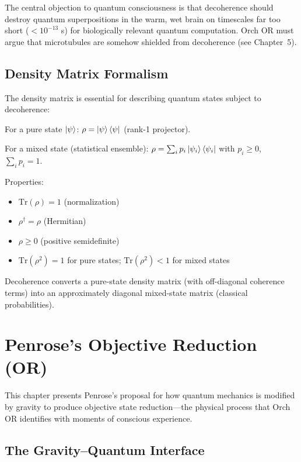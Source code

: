 \documentclass[11pt,a4paper]{report}
\begin{document}
The central objection to quantum consciousness is that decoherence should destroy quantum superpositions in the warm, wet brain on timescales far too short ($< 10^{-13}$ s) for biologically relevant quantum computation. Orch OR must argue that microtubules are somehow shielded from decoherence (see Chapter~5).

\section{Density Matrix Formalism}

The density matrix is essential for describing quantum states subject to decoherence:

\begin{definitionbox}
For a pure state $\ket{\psi}$: $\rho = \ket{\psi}\bra{\psi}$ (rank-1 projector).

For a mixed state (statistical ensemble): $\rho = \sum_i p_i \ket{\psi_i}\bra{\psi_i}$ with $p_i \geq 0$, $\sum_i p_i = 1$.

Properties:
\begin{itemize}[leftmargin=1.5em]
  \item $\text{Tr}(\rho) = 1$ (normalization)
  \item $\rho^\dagger = \rho$ (Hermitian)
  \item $\rho \geq 0$ (positive semidefinite)
  \item $\text{Tr}(\rho^2) = 1$ for pure states; $\text{Tr}(\rho^2) < 1$ for mixed states
\end{itemize}
Decoherence converts a pure-state density matrix (with off-diagonal coherence terms) into an approximately diagonal mixed-state matrix (classical probabilities).
\end{definitionbox}


\chapter{Penrose's Objective Reduction (OR)}

This chapter presents Penrose's proposal for how quantum mechanics is modified by gravity to produce objective state reduction---the physical process that Orch OR identifies with moments of conscious experience.

\section{The Gravity--Quantum Interface}
\end{document}
